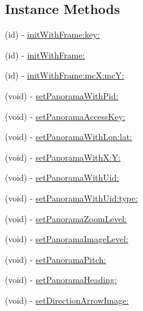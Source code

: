 \subsection*{Instance Methods}
\begin{DoxyCompactItemize}
\item 
(id) -\/ \hyperlink{interface_baidu_panorama_view_a4d957cbad6a5ac3d913aa2f568f15e48}{init\+With\+Frame\+:key\+:}
\item 
(id) -\/ \hyperlink{interface_baidu_panorama_view_a6296448412d150d5e3c24f6fd7904fef}{init\+With\+Frame\+:}
\item 
(id) -\/ \hyperlink{interface_baidu_panorama_view_a64eae772265a972f0f2c6489243d2c4f}{init\+With\+Frame\+:mc\+X\+:mc\+Y\+:}
\item 
(void) -\/ \hyperlink{interface_baidu_panorama_view_af7206f937ec6fbc907eed36b8fa9ebce}{set\+Panorama\+With\+Pid\+:}
\item 
(void) -\/ \hyperlink{interface_baidu_panorama_view_a61b52d2ed24f7bf2d8e08a69cf16ce37}{set\+Panorama\+Access\+Key\+:}
\item 
(void) -\/ \hyperlink{interface_baidu_panorama_view_a6ed6dfcdeda2ee9b38645b90628591e8}{set\+Panorama\+With\+Lon\+:lat\+:}
\item 
(void) -\/ \hyperlink{interface_baidu_panorama_view_a6172e4a8b331b9e21f95db4ccd36afd4}{set\+Panorama\+With\+X\+:\+Y\+:}
\item 
(void) -\/ \hyperlink{interface_baidu_panorama_view_a339496b149bdd1d4d7b8852824f19df7}{set\+Panorama\+With\+Uid\+:}
\item 
(void) -\/ \hyperlink{interface_baidu_panorama_view_a23b03774273d83fb4c470a00f5b3ff63}{set\+Panorama\+With\+Uid\+:type\+:}
\item 
(void) -\/ \hyperlink{interface_baidu_panorama_view_ab24225239b38859fc66e92e9998213b4}{set\+Panorama\+Zoom\+Level\+:}
\item 
(void) -\/ \hyperlink{interface_baidu_panorama_view_ace6a54e7309447c11f6b9d42a93d827e}{set\+Panorama\+Image\+Level\+:}
\item 
(void) -\/ \hyperlink{interface_baidu_panorama_view_a11f799b9f91e66361f9125a65d7a6904}{set\+Panorama\+Pitch\+:}
\item 
(void) -\/ \hyperlink{interface_baidu_panorama_view_a11d516e6b3da9841779b3391de72bb1a}{set\+Panorama\+Heading\+:}
\item 
(void) -\/ \hyperlink{interface_baidu_panorama_view_a4614dac7c2d82742861e0849f73f900a}{set\+Direction\+Arrow\+Image\+:}
\item 

\end{DoxyCompactItemize}
